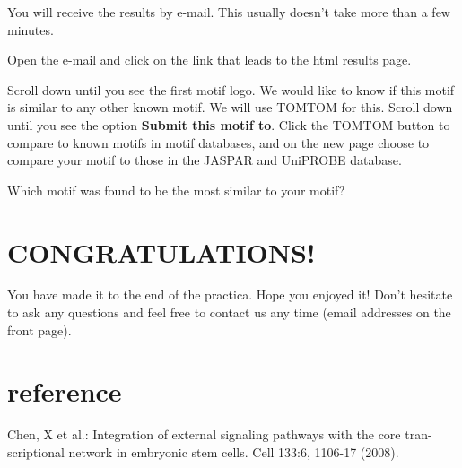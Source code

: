 \begin{note}
You will receive the results by e-mail. This usually doesn't take more than a few minutes.
\end{note}

\begin{steps}
Open the e-mail and click on the link that leads to the html results page.

Scroll down until you see the first motif logo. We would like to know if this motif is similar to any other known motif. We will use TOMTOM for this. Scroll down until you see the option \textbf{Submit this motif to}. Click the TOMTOM button to compare to known motifs in motif databases, and on the new page choose to compare your motif to those in the JASPAR and UniPROBE database.
\end{steps}


\begin{questions}
Which motif was found to be the most similar to your motif?
\end{questions}


\section{CONGRATULATIONS!}
You have made it to the end of the practica. Hope you enjoyed it! Don't hesitate to ask any questions and feel free to contact us any time (email addresses on the front page).

\newpage
\section{reference}
Chen, X et al.: Integration of external signaling pathways with the core tran-scriptional network in embryonic stem cells. Cell 133:6, 1106-17 (2008).

